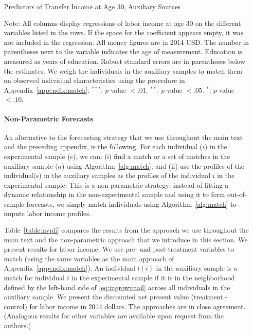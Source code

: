 \begin{table}[H]
\begin{threeparttable}
\caption{Predictors of Transfer Income at Age 30, Auxiliary Sources}
\label{table:predtransferincome}
\centering
\footnotesize

\begin{tablenotes}
\footnotesize
\item Note: All columns display regressions of labor income at age 30 on the different variables listed in the rows. If the space for the coefficient appears empty, it was not included in the regression. All money figures are in 2014 USD. The number in parentheses next to the variable indicates the age of measurement. Education is measured as years of education. Robust standard errors are in parentheses below the estimates. We weigh the individuals in the auxiliary samples to match them on observed individual characteristics using the procedure in Appendix~\ref{appendix:match}. $^{***}$: $p$-value $< .01$. $^{**}$: $p$-value $< .05$. $^{*}$: $p$-value $< .10$.
\end{tablenotes}
\end{threeparttable}
\end{table}

\paragraph{Non-Parametric Forecasts} \label{appendix:nonpar}

\noindent An alternative to the forecasting strategy that we use throughout the main text and the preceding appendix, is the following. For each individual ($i$) in the experimental sample ($e$), we can: (i) find a match or a set of matches in the auxiliary sample ($n$) using Algorithm~\ref{alg:match}; and (ii) use the profiles of the individual(s) in the auxiliary samples as the profiles of the individual $i$ in the experimental sample. This is a non-parametric strategy: instead of fitting a dynamic relationship in the non-experimental sample and using it to form out-of-sample forecasts, we simply match individuals using Algorithm~\ref{alg:match} to impute labor income profiles.

\noindent Table~\ref{table:nvpli} compares the results from the approach we use throughout the main text and the non-parametric approach that we introduce in this section. We present results for labor income. We use pre- and post-treatment variables to match (using the same variables as the main approach of Appendix~\ref{appendix:match}). An individual $l(i)$ in the auxiliary sample is a match for individual $i$ in the experimental sample if it is in the neighborhood defined by the left-hand side of \eqref{eq:ingrownnail} across all individuals in the auxiliary sample. We present the discounted net present value (treatment - control) for labor income in 2014 dollars. The approaches are in close agreement. (Analogous results for other variables are available upon request from the authors.)\\

